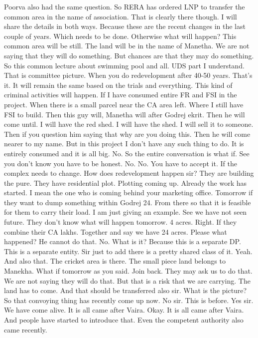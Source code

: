Poorva also had the same question.
So RERA has ordered LNP to transfer the common area in the name of association.
That is clearly there though.
I will share the details in both ways.
Because these are the recent changes in the last couple of years.
Which needs to be done.
Otherwise what will happen?
This common area will be still.
The land will be in the name of Manetha.
We are not saying that they will do something.
But chances are that they may do something.
So this common lecture about swimming pool and all.
UDS part I understand.
That is committee picture.
When you do redevelopment after 40-50 years.
That's it.
It will remain the same based on the trials and everything.
This kind of criminal activities will happen.
If I have consumed entire FR and FSI in the project.
When there is a small parcel near the CA area left.
Where I still have FSI to build.
Then this guy will, Manetha will after Godrej ekrit.
Then he will come until.
I will have the red shed.
I will have the shed.
I will sell it to someone.
Then if you question him saying that why are you doing this.
Then he will come nearer to my name.
But in this project I don't have any such thing to do.
It is entirely consumed and it is all big.
No.
So the entire conversation is what if.
See you don't know you have to be honest.
No.
No.
You have to accept it.
If the complex needs to change.
How does redevelopment happen sir?
They are building the pure.
They have residential plot.
Plotting coming up.
Already the work has started.
I mean the one who is coming behind your marketing office.
Tomorrow if they want to dump something within Godrej 24.
From there so that it is feasible for them to carry their load.
I am just giving an example.
See we have not seen future.
They don't know what will happen tomorrow.
4 acres.
Right.
If they combine their CA lakhs.
Together and say we have 24 acres.
Please what happened?
He cannot do that.
No.
What is it?
Because this is a separate DP.
This is a separate entity.
Sir just to add there is a pretty shared class of it.
Yeah.
And also that.
The cricket area is there.
The small piece land belongs to Manekha.
What if tomorrow as you said.
Join back.
They may ask us to do that.
We are not saying they will do that.
But that is a risk that we are carrying.
The land has to come.
And that should be transferred also sir.
What is the picture?
So that convoying thing has recently come up now.
No sir.
This is before.
Yes sir.
We have come alive.
It is all came after Vaira.
Okay.
It is all came after Vaira.
And people have started to introduce that.
Even the competent authority also came recently.
